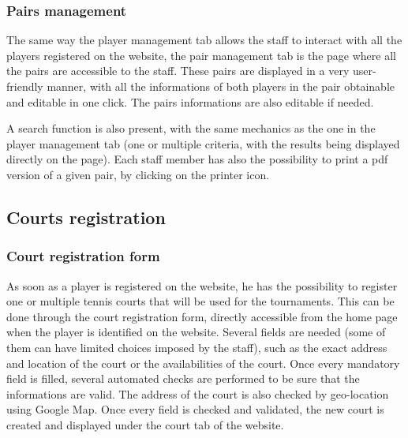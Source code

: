 \subsubsection{Pairs management}
\label{subs:Pairs management}


The same way the player management tab allows the staff to interact with all the players registered on the website, the pair management tab is the page where all the pairs are accessible to the staff. These pairs are displayed in a very user-friendly manner, with all the informations of both players in the pair obtainable and editable in one click. The pairs informations are also editable if needed. \newline

A search function is also present, with the same mechanics as the one in the player management tab (one or multiple criteria, with the results being displayed directly on the page). Each staff member has also the possibility to print a pdf version of a given pair, by clicking on the printer icon.

\subsection{Courts registration}
\label{sub:Courts registration}

\subsubsection{Court registration form}
\label{subs:Court registration form}


As soon as a player is registered on the website, he has the possibility to register one or multiple tennis courts that will be used for the tournaments. This can be done through the court registration form, directly accessible from the home page when the player is identified on the website. Several fields are needed (some of them can have limited choices imposed by the staff), such as the exact address and location of the court or the availabilities of the court. Once every mandatory field is filled, several automated checks are performed to be sure that the informations are valid. The address of the court is also checked by geo-location using Google Map.
Once every field is checked and validated, the new court is created and displayed under the court tab of the website.

